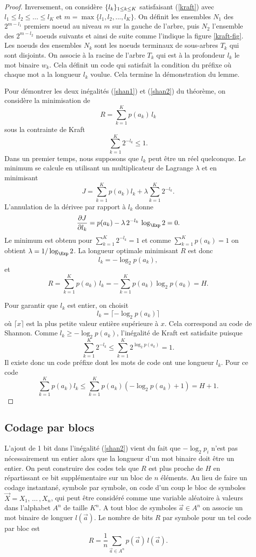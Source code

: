 \begin{proof}
Inversement, on consid\`ere $\{ l_k \}_{ 1 \leq k \leq K}$ satisfaisant
(\ref{kraft}) avec $l_1 \leq l_2 \leq ... \leq l_K$ et
$m = \max \{l_1, l_2, ... , l_K\}$.
On d\'efinit les ensembles $N_1$ des $2^{m-l_1}$ premiers
noeud au niveau $m$ sur la gauche de l'arbre, puis $N_2$
l'ensemble des $2^{m-l_2}$ noeuds suivants et ainsi de suite
comme l'indique la figure \ref{kraft-fig}.
Les noeuds des ensembles $N_k$ sont les noeuds terminaux
de sous-arbres $T_k$ qui sont disjoints. On associe
\`a la racine de l'arbre $T_k$ qui est \`a la profondeur
$l_k$ le mot binaire $w_k$. Cela d\'efinit un code
qui satisfait la condition du pr\'efixe o\`u chaque
mot a la longueur $l_k$ voulue.
Cela termine la d\'emonstration du lemme.

Pour d\'emontrer les deux in\'egalit\'es (\ref{shan1}) et
(\ref{shan2}) du
th\'eor\`eme, on consid\`ere la minimisation de
\[
R = \sum_{k=1}^K p(a_k) \,l_k
\]
sous la contrainte de Kraft
\[
\sum_{k=1}^K 2^{-l_k} \leq 1 .
\]
Dans un premier temps, nous
supposons que $l_k$ peut \^etre un r\'eel quelconque.
Le minimum se calcule en utilisant un multiplicateur de
Lagrange $\lambda$ et en minimisant
\[
J = \sum_{k=1}^K p(a_k) l_k + \lambda \sum_{k=1}^K 2^{-l_k} .
\]
L'annulation de la d\'erivee par rapport \`a $l_k$ donne
\[
\frac {\partial J} {\partial l_k} = p(a_k) - \lambda \,2^{-l_k}\,
\log_\Exp 2  = 0 .
\]
Le minimum est obtenu pour $\sum_{k=1}^K 2^{-l_k} = 1$
et comme $\sum_{k=1}^K p(a_k) = 1$ on obtient
$\lambda = 1/\log_\Exp 2$. La longueur optimale minimisant
$R$ est donc
\[
l_k = -\log_2 p(a_k) ,
\]
et
\[
R =
\sum_{k=1}^K p(a_k)\, l_k = - \sum_{k=1}^K p(a_k) \log_2 p(a_k) = H .
\]

Pour garantir que $l_k$ est entier, on choisit
\[
l_k = \lceil - \log_2 p(a_k) \rceil
\]
o\`u $\lceil x \rceil$ est la plus petite valeur enti\`ere
sup\'erieure \`a $x$.
Cela correspond au code de Shannon.
Comme $l_k \geq - \log_2 p(a_k)$, l'in\'egalit\'e
de Kraft est satisfaite puisque
\[
\sum_{k=1}^K 2^{-l_k} \leq \sum_{k=1}^K 2^{\log_2 p(a_k)} = 1 .
\]
Il existe donc un code pr\'efixe dont les mots de code
ont une longueur $l_k$. Pour ce code
\[
\sum_{k=1}^K p(a_k) l_k \leq
\sum_{k=1}^K p(a_k) (-\log_2 p(a_k) + 1) = H + 1 .
\]
\end{proof}

\subsection{Codage par blocs}
L'ajout de 1 bit dans l'in\'egalit\'e (\ref{shan2})
vient du fait que $-\log_2 p_i$ n'est pas n\'ecessairement
un entier alors que la longueur d'un mot binaire doit
\^etre un entier. On peut construire des codes tels que
$R$ est plus proche de $H$ en r\'epartissant ce bit
suppl\'ementaire sur un bloc de $n$ \'el\'ements.
Au lieu de faire un codage instantan\'e, symbole par symbole,
on code d'un coup le bloc de symboles
$\vec X = X_1 , \,...\,,X_n$, qui peut \^etre consid\'er\'e
comme une variable al\'eatoire \`a valeurs dans
l'alphabet $A^n$ de taille $K^n$.
A tout bloc de symboles $\vec a \in A^n$ on associe un
mot binaire de longuer $l(\vec a)$. Le nombre de bits
$R$ par symbole pour un tel code par bloc est
\[
R = \frac 1 n \sum_{\vec a \in A^n} p(\vec a) \, l(\vec a) .
\]


